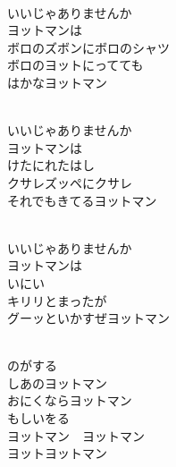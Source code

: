 \documentclass[10pt,b5j]{tarticle} %
\begin{document}
\begin{enumerate}
\begin{minipage}[c]{\blocksize}
    \end{minipage}
    \begin{minipage}[c]{\blocksize}
        
        \vspace{\linespace}
        \item~\\
        いいじゃありませんか\\
        ヨットマンは\\
        ボロのズボンにボロのシャツ\\
        ボロのヨットにってても\\
        はかなヨットマン
        
    \end{minipage}
    \begin{minipage}[c]{\blocksize}
        
        \vspace{\linespace}
        \item~\\
        いいじゃありませんか\\
        ヨットマンは\\
        けたにれたはし\\
        クサレズッペにクサレ\\
        それでもきてるヨットマン
        
    \end{minipage}
    \begin{minipage}[c]{\blocksize}
        
        \vspace{\linespace}
        \item~\\
        いいじゃありませんか\\
        ヨットマンは\\
        いにい\\
        キリリとまったが\\
        グーッといかすぜヨットマン
        
    \end{minipage}
    \begin{minipage}[c]{\blocksize}
        
        \vspace{\linespace}
        \item~\\
        のがする\\
        しあのヨットマン\\
        おにくならヨットマン\\
        もしいをる\\
        ヨットマン　ヨットマン\\
        ヨットヨットマン
    

\end{minipage}
\end{enumerate}
\end{document}
